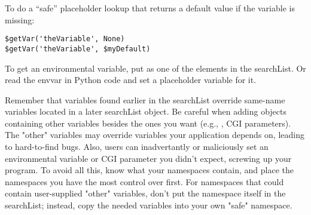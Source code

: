 To do a ``safe'' placeholder lookup that returns a default value if the
variable is missing:
\begin{verbatim}
$getVar('theVariable', None)
$getVar('theVariable', $myDefault)
\end{verbatim}

To get an environmental variable, put  as one of the
elements in the searchList.  Or read the envvar in Python code and set a
placeholder variable for it.

Remember that variables found earlier in the searchList override same-name
variables located in a later searchList object.  Be careful when adding objects
containing other variables besides the ones you want (e.g., ,
CGI parameters).  The "other" variables may override variables your application
depends on, leading to hard-to-find bugs.  Also, users can inadvertantly or
maliciously set an environmental variable or CGI parameter you didn't expect,
screwing up your program.  To avoid all this, know what your namespaces
contain, and place the namespaces you have the most control over first.  For
namespaces that could contain user-supplied "other" variables, don't put the
namespace itself in the searchList; instead, copy the needed variables into
your own "safe" namespace.



